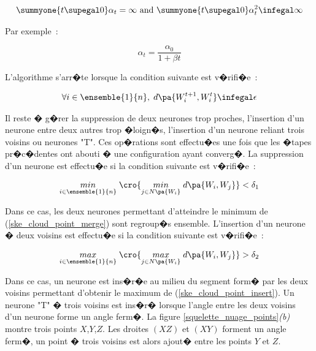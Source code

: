         
            \begin{eqnarray*}
            \summyone{t \supegal 0} \alpha_t = \infty \text { and } \summyone{t \supegal 0} 
                        \alpha_t^2 \infegal \infty
            \end{eqnarray*}
            
Par exemple~:

            $$
            \alpha_t = \frac{\alpha_0}{1+\beta t}
            $$            

L'algorithme s'arr�te lorsque la condition suivante est v�rifi�e~:

            \begin{eqnarray*}
            \forall i \in \ensemble{1}{n}, \; d\pa{W_i^{t+1}, W_i^{t} } \infegal \epsilon
            \end{eqnarray*}

Il reste � g�rer la suppression de deux neurones trop proches, l'insertion d'un neurone entre deux autres trop �loign�s, l'insertion d'un neurone reliant trois voisins ou neurones "T". Ces op�rations sont effectu�es une fois que les �tapes pr�c�dentes ont abouti � une configuration ayant converg�. La suppression d'un neurone est effectu�e si la condition suivante est v�rifi�e~:


            \begin{eqnarray}
            \underset{ i \in \ensemble{1}{n} }     { min }\; \cro{ 
            \underset{ j \in N\pa{W_i} }              { min }\; d\pa{W_i,W_j} } 
                            < \delta_1 
            \label{ske_cloud_point_merge}
            \end{eqnarray}

Dans ce cas, les deux neurones permettant d'atteindre le minimum de (\ref{ske_cloud_point_merge}) sont regroup�s ensemble. L'insertion d'un neurone � deux voisins est effectu�e si la condition suivante est v�rifi�e~:

            \begin{eqnarray}
            \underset{ i \in \ensemble{1}{n} }     { max }\; \cro{ 
            \underset{ j \in N\pa{W_i} }              { max }\; d\pa{W_i,W_j} } 
                            > \delta_2
            \label{ske_cloud_point_insert}
            \end{eqnarray}

Dans ce cas, un neurone est ins�r�e au milieu du segment form� par les deux voisins permettant d'obtenir le maximum de (\ref{ske_cloud_point_insert}). Un neurone "T" � trois voisins est ins�r� lorsque l'angle entre les deux voisins d'un neurone forme un angle ferm�. La figure \ref{squelette_nuage_points}\textit{(b)} montre trois points $X$,$Y$,$Z$. Les droites $(XZ)$ et $(XY)$ forment un angle ferm�, un point � trois voisins est alors ajout� entre les points $Y$ et $Z$.





